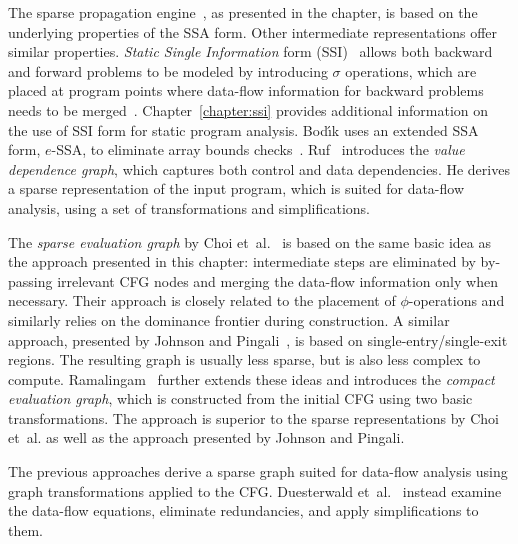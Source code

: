 The sparse propagation engine~\cite{novillo:bib:N05,bib:wegman.ea-91}, as
presented in the chapter, is based on the
underlying properties of the SSA form. Other intermediate representations offer
similar properties. \emph{Static Single Information} form
(SSI)~\cite{novillo:bib:S05} allows both backward and forward problems to be
modeled by introducing $\sigma$ operations, which are placed at program points
where data-flow information for backward problems needs to be
merged~\cite{novillo:bib:S04}. Chapter~\ref{chapter:ssi} provides additional
information on the use of SSI form for static program analysis.
Bod\'{\i}k uses an extended SSA form, $e$-SSA,
to eliminate array bounds checks~\cite{novillo:bib:BGV00}.
Ruf~\cite{novillo:bib:R95} introduces the \emph{value dependence graph}, which
captures both control and data dependencies. He derives a sparse representation
of the input program, which is suited for data-flow analysis, using a set of
transformations and simplifications.

The \emph{sparse evaluation graph} by Choi et~al.~\cite{novillo:bib:CCF91} is
based on the same basic idea as the approach presented in this chapter:
intermediate steps are eliminated by by-passing irrelevant CFG nodes and
merging the data-flow information only when necessary. Their approach is closely
related to the placement of $\phi$-operations and similarly relies on the
dominance frontier during construction. A similar approach, presented by Johnson
and Pingali~\cite{novillo:bib:JO93}, is based on single-entry/single-exit
regions. The resulting graph is usually less sparse, but is also less complex to
compute. Ramalingam~\cite{Ramalingam02} further extends these ideas and
introduces the \emph{compact evaluation graph}, which is constructed from the
initial CFG using two basic transformations. The approach is superior to the
sparse representations by Choi et~al. as well as the approach presented by
Johnson and Pingali.

The previous approaches derive a sparse graph suited for data-flow analysis
using graph transformations applied to the CFG.
Duesterwald et~al.~\cite{novillo:bib:DGS94} instead examine the data-flow
equations, eliminate redundancies, and apply simplifications to them.

